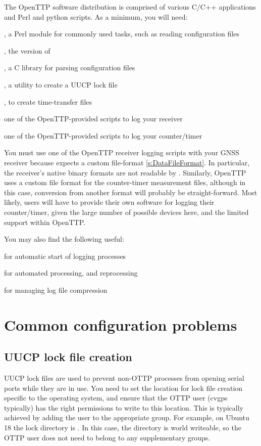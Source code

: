 The OpenTTP software distribution is comprised of various C/C++ applications and Perl and python scripts.
As a minimum, you will need:
\begin{description*}
	\item {}, a Perl module for commonly used tasks, such as reading configuration files
	\item {}, the  version of 
	\item {}, a C library for parsing configuration files
	\item {}, a utility to create a UUCP lock file
	\item {}, to create time-transfer files
	\item one of the OpenTTP-provided scripts to log your receiver
	\item one of the OpenTTP-provided scripts to log your counter/timer
\end{description*}

You must use one of the OpenTTP receiver logging scripts with your GNSS receiver because 
expects a custom file-format \ref{s:DataFileFormat}. In particular, the
receiver's native binary formats are not readable by . Similarly, OpenTTP uses a custom file
format for the counter-timer measurement files, although in this case, conversion from another format
will probably be straight-forward. Most likely, users will have to provide their own software for
logging their counter/timer, given the large number of possible devices here, and the limited
support within OpenTTP.

You may also find the following useful:
\begin{description*}
	\item[]  for automatic start of logging processes
	\item[]  for automated processing, and reprocessing
	\item[]  for managing log file compression
\end{description*}


\section{Common configuration problems}

\subsection{UUCP lock file creation}

UUCP lock files are used to prevent non-OTTP processes from opening serial ports while they are 
in use. You need to set the location for lock file creation specific to the operating system, 
and ensure that the OTTP user (cvgps typically) has the right permissions to write to this location. 
This is typically achieved by adding the user to the appropriate group. 
For example, on Ubuntu 18 the lock directory is . 
In this case, the directory is world writeable, so 
the OTTP user does not need to belong to any supplementary groups.
